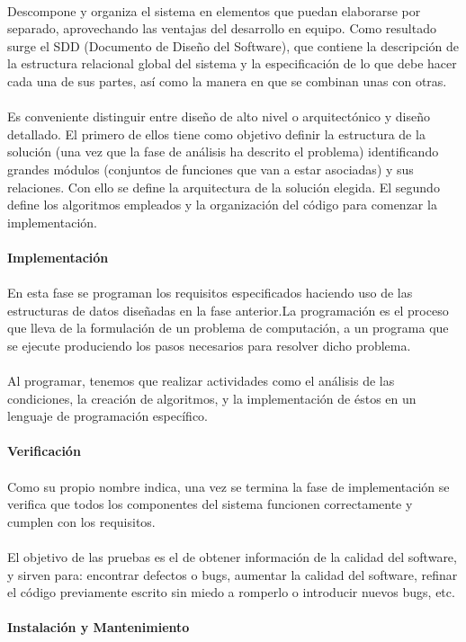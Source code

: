 \\
Descompone y organiza el sistema en elementos que puedan elaborarse por separado, aprovechando las ventajas del desarrollo en equipo. Como resultado surge el SDD (Documento de Diseño del Software), que contiene la descripción de la estructura relacional global del sistema y la especificación de lo que debe hacer cada una de sus partes, así como la manera en que se combinan unas con otras.
\\
\\
Es conveniente distinguir entre diseño de alto nivel o arquitectónico y diseño detallado. El primero de ellos tiene como objetivo definir la estructura de la solución (una vez que la fase de análisis ha descrito el problema) identificando grandes módulos (conjuntos de funciones que van a estar asociadas) y sus relaciones. Con ello se define la arquitectura de la solución elegida. El segundo define los algoritmos empleados y la organización del código para comenzar la implementación.
\\
\\
\textbf{Implementación}
\\
\\
En esta fase se programan los requisitos especificados haciendo uso de las estructuras de datos diseñadas en la fase anterior.La programación es el proceso que lleva de la formulación de un problema de computación, a un programa que se ejecute produciendo los pasos necesarios para resolver dicho problema.
\\
\\
Al programar, tenemos que realizar actividades como el análisis de las condiciones, la creación de algoritmos,  y la implementación de éstos en un lenguaje de programación específico.
\\
\\
\textbf{Verificación}
\\
\\
Como su propio nombre indica, una vez se termina la fase de implementación se verifica que todos los componentes del sistema funcionen correctamente y cumplen con los requisitos.
\\
\\
El objetivo de las pruebas es el de obtener información de la calidad del software, y sirven para: encontrar defectos o bugs, aumentar la calidad del software, refinar el código previamente escrito sin miedo a romperlo o introducir nuevos bugs, etc.
\\
\\
\textbf{Instalación y Mantenimiento}
